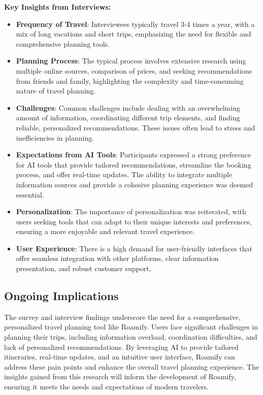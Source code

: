 \documentclass[conference]{IEEEtran}
\begin{document}
        \textbf{Key Insights from Interviews:}

        \begin{itemize}
            \item \textbf{Frequency of Travel}: Interviewees typically travel 3-4 times a year, with a mix of long vacations and short trips, emphasizing the need for flexible and comprehensive planning tools.
            \item \textbf{Planning Process}: The typical process involves extensive research using multiple online sources, comparison of prices, and seeking recommendations from friends and family, highlighting the complexity and time-consuming nature of travel planning.
            \item \textbf{Challenges}: Common challenges include dealing with an overwhelming amount of information, coordinating different trip elements, and finding reliable, personalized recommendations. These issues often lead to stress and inefficiencies in planning.
            \item \textbf{Expectations from AI Tools}: Participants expressed a strong preference for AI tools that provide tailored recommendations, streamline the booking process, and offer real-time updates. The ability to integrate multiple information sources and provide a cohesive planning experience was deemed essential.
            \item \textbf{Personalization}: The importance of personalization was reiterated, with users seeking tools that can adapt to their unique interests and preferences, ensuring a more enjoyable and relevant travel experience.
            \item \textbf{User Experience}: There is a high demand for user-friendly interfaces that offer seamless integration with other platforms, clear information presentation, and robust customer support.
        \end{itemize}

    \subsection{Ongoing Implications}
        The survey and interview findings underscore the need for a comprehensive, personalized travel planning tool like Roamify. Users face significant challenges in planning their trips, including information overload, coordination difficulties, and lack of personalized recommendations. By leveraging AI to provide tailored itineraries, real-time updates, and an intuitive user interface, Roamify can address these pain points and enhance the overall travel planning experience. The insights gained from this research will inform the development of Roamify, ensuring it meets the needs and expectations of modern travelers.
\end{document}
